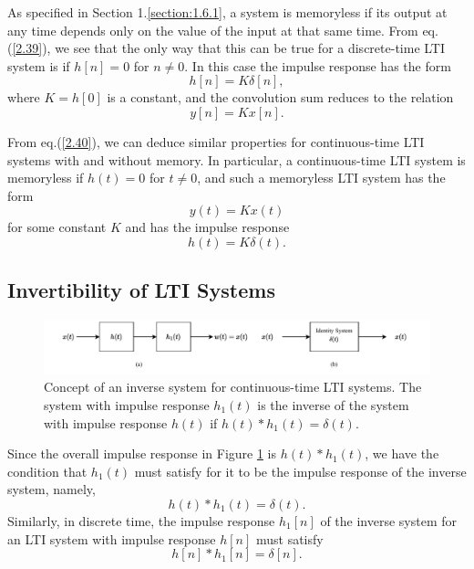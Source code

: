 \documentclass[a4paper,10pt,twoside]{book}
\begin{document}
As specified in Section 1.\ref{section:1.6.1}, a system is memoryless if its output at any time depends only on the value of the input at that same time. From eq.\;(\ref{2.39}), we see that the only way that this can be true for a discrete-time LTI system is if $h[n]=0$ for $n\ne 0$. In this case the impulse response has the form
\begin{equation}
    h[n]=K\delta[n],
    \label{2.62}
\end{equation}
where $K=h[0]$ is a constant, and the convolution sum reduces to the relation
\begin{equation}
    y[n]=Kx[n].
\end{equation}

From eq.\;(\ref{2.40}), we can deduce similar properties for continuous-time LTI systems with and without memory. In particular, a continuous-time LTI system is memoryless if $h(t)=0$ for $t\ne 0$, and such a memoryless LTI system has the form
\begin{equation}
    y(t)=Kx(t)
    \label{2.64}
\end{equation}
for some constant $K$ and has the impulse response
\begin{equation}
    h(t)=K\delta(t).
    \label{2.65}
\end{equation}

\subsection{Invertibility of LTI Systems}

\begin{figure}[htbp]
    \centering
    \includegraphics[width=\linewidth]{Fig6.pdf}
    \caption{Concept of an inverse system for continuous-time LTI systems. The system with impulse response $h_1(t)$ is the inverse of the system with impulse response $h(t)$ if $h(t)*h_1(t)=\delta(t)$.}
    \label{Fig6}
\end{figure}

Since the overall impulse response in Figure \ref{Fig6} is $h(t)*h_1(t)$, we have the condition that $h_1(t)$ must satisfy for it to be the impulse response of the inverse system, namely,
\begin{equation}
    h(t)*h_1(t)=\delta(t).
    \label{2.66}
\end{equation}
Similarly, in discrete time, the impulse response $h_1[n]$ of the inverse system for an LTI system with impulse response $h[n]$ must satisfy
\begin{equation}
    h[n]*h_1[n]=\delta[n].
    \label{2.67}
\end{equation}
\end{document}
